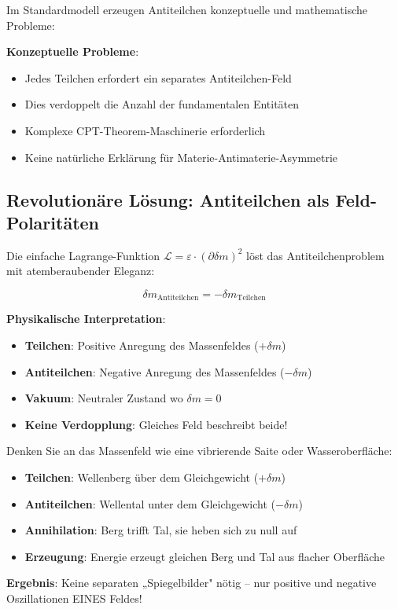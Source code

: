 \documentclass[12pt,a4paper]{article}
\newcommand{\Lag}{\mathcal{L}}
\newcommand{\deltam}{\delta m}
\theoremstyle{definition}
\theoremstyle{remark}
\begin{document}
	Im Standardmodell erzeugen Antiteilchen konzeptuelle und mathematische Probleme:
	
	\textbf{Konzeptuelle Probleme}:
	\begin{itemize}
		\item Jedes Teilchen erfordert ein separates Antiteilchen-Feld
		\item Dies verdoppelt die Anzahl der fundamentalen Entitäten
		\item Komplexe CPT-Theorem-Maschinerie erforderlich
		\item Keine natürliche Erklärung für Materie-Antimaterie-Asymmetrie
	\end{itemize}
	
	\subsection{Revolutionäre Lösung: Antiteilchen als Feld-Polaritäten}
	
	Die einfache Lagrange-Funktion $\Lag = \varepsilon \cdot (\partial \deltam)^2$ löst das Antiteilchenproblem mit atemberaubender Eleganz:
	
	\begin{equation}
		\boxed{\deltam_{\text{Antiteilchen}} = -\deltam_{\text{Teilchen}}}
		\label{eq:antiparticle_solution}
	\end{equation}
	
	\textbf{Physikalische Interpretation}:
	\begin{itemize}
		\item \textbf{Teilchen}: Positive Anregung des Massenfeldes ($+\deltam$)
		\item \textbf{Antiteilchen}: Negative Anregung des Massenfeldes ($-\deltam$)  
		\item \textbf{Vakuum}: Neutraler Zustand wo $\deltam = 0$
		\item \textbf{Keine Verdopplung}: Gleiches Feld beschreibt beide!
	\end{itemize}
	
	\begin{tcolorbox}[colback=green!5!white,colframe=green!75!black,title=Elegantes Antiteilchen-Bild]
		Denken Sie an das Massenfeld wie eine vibrierende Saite oder Wasseroberfläche:
		\begin{itemize}
			\item \textbf{Teilchen}: Wellenberg über dem Gleichgewicht ($+\deltam$)
			\item \textbf{Antiteilchen}: Wellental unter dem Gleichgewicht ($-\deltam$)
			\item \textbf{Annihilation}: Berg trifft Tal, sie heben sich zu null auf
			\item \textbf{Erzeugung}: Energie erzeugt gleichen Berg und Tal aus flacher Oberfläche
		\end{itemize}
		
		\textbf{Ergebnis}: Keine separaten „Spiegelbilder" nötig -- nur positive und negative Oszillationen EINES Feldes!
	\end{tcolorbox}
	
\end{document}
